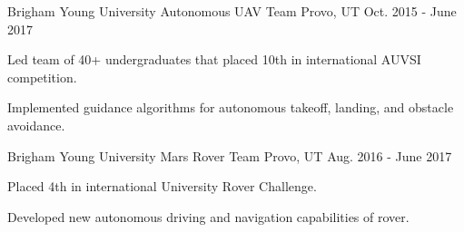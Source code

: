 

\begin{cventries}

  \cventry
    {Brigham Young University} %
    {Autonomous UAV Team} %
    {Provo, UT} %
    {Oct. 2015 - June 2017} %
    {
      \begin{cvitems} %
        \item {Led team of 40+ undergraduates that placed 10th in international
          AUVSI competition.}
        \item {Implemented guidance algorithms for autonomous takeoff, landing,
          and obstacle avoidance.}
      \end{cvitems}
    }

  \cventry
    {Brigham Young University} %
    {Mars Rover Team} %
    {Provo, UT} %
    {Aug. 2016 - June 2017} %
    {
      \begin{cvitems} %
        \item {Placed 4th in international University Rover Challenge.}
        \item {Developed new autonomous driving and navigation capabilities of
          rover.}
      \end{cvitems}
    }

\end{cventries}
